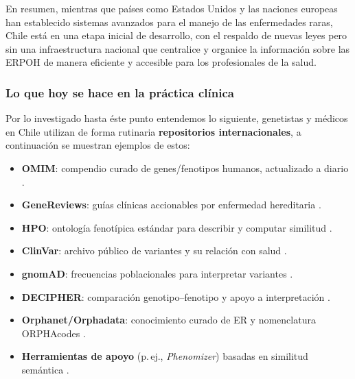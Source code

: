 \documentclass{article}
\begin{document}
En resumen, mientras que países como Estados Unidos y las naciones europeas han establecido sistemas avanzados para el manejo de las enfermedades raras, Chile está en una etapa inicial de desarrollo, con el respaldo de nuevas leyes pero sin una infraestructura nacional que centralice y organice la información sobre las ERPOH de manera eficiente y accesible para los profesionales de la salud.

\subsubsection*{Lo que hoy se hace en la práctica clínica}
Por lo investigado hasta éste punto entendemos lo siguiente, genetistas y médicos en Chile utilizan de forma rutinaria \textbf{repositorios internacionales}, a continuación se muestran ejemplos de estos:
\begin{itemize}[leftmargin=1.2em]
  \item \textbf{OMIM}: compendio curado de genes/fenotipos humanos, actualizado a diario \cite{omim2015nar,omimncbi}. 
  \item \textbf{GeneReviews}: guías clínicas accionables por enfermedad hereditaria \cite{genereviews}.
  \item \textbf{HPO}: ontología fenotípica estándar para describir y computar similitud \cite{kohler2021nar,hpo2024}.
  \item \textbf{ClinVar}: archivo público de variantes y su relación con salud \cite{clinvar2016nar,clinvarIntro2024}.
  \item \textbf{gnomAD}: frecuencias poblacionales para interpretar variantes \cite{gnomad2021,gudmundsson2021}.
  \item \textbf{DECIPHER}: comparación genotipo–fenotipo y apoyo a interpretación \cite{decipher2013,decipherPortal}. 
  \item \textbf{Orphanet/Orphadata}: conocimiento curado de ER y nomenclatura ORPHAcodes \cite{orpha2025,orphadata2024}.
  \item \textbf{Herramientas de apoyo} (p.\,ej., \textit{Phenomizer}) basadas en similitud semántica \cite{phenomizer2009,hpoworkshop}.
\end{itemize}
\end{document}

